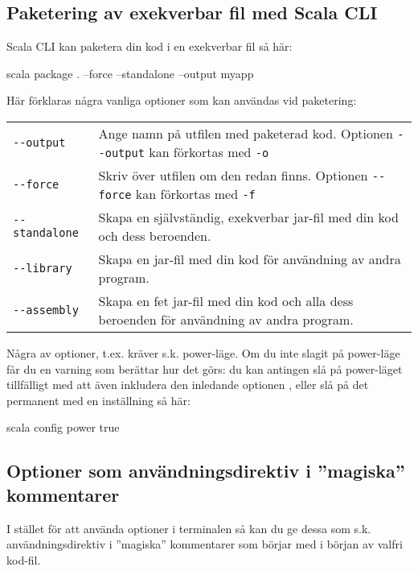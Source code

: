 \subsection{Paketering av exekverbar fil med Scala CLI}

\noindent Scala CLI kan paketera din kod i en exekverbar fil så här:
\begin{REPLsmall}
scala package . --force --standalone --output myapp
\end{REPLsmall}

\noindent Här förklaras några vanliga optioner som kan användas vid paketering: 
\begin{table}[H]
\begin{tabular}{l p{8.5cm}}
\texttt{-{}-output} & Ange namn på utfilen med paketerad kod. Optionen \texttt{-{}-output} kan förkortas med \texttt{-o}\\
\texttt{-{}-force} & Skriv över utfilen om den redan finns. Optionen \texttt{-{}-force} kan förkortas med \texttt{-f} \\
\texttt{-{}-standalone} & Skapa en självständig, exekverbar jar-fil med din kod och dess beroenden.\\
\texttt{-{}-library} & Skapa en jar-fil med din kod för användning av andra program.\\
\texttt{-{}-assembly} & Skapa en fet jar-fil med din kod och alla dess beroenden för användning av andra program.\\
\end{tabular}
\end{table}

Några av optioner, t.ex.  kräver s.k. power-läge. Om du inte slagit på power-läge får du en varning som berättar hur det görs: du kan antingen slå på power-läget tillfälligt med att även inkludera den inledande optionen , eller slå på det permanent med en inställning så här:
\begin{REPLnonum}
scala config power true
\end{REPLnonum}

\subsection{Optioner som användningsdirektiv i ''magiska'' kommentarer}

\noindent I stället för att använda optioner i terminalen så kan du ge dessa som s.k. användningsdirektiv  i ''magiska'' kommentarer som börjar med  i början av valfri kod-fil. 

